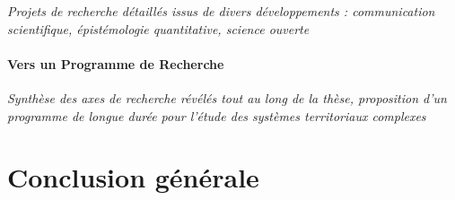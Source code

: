 
\textit{Projets de recherche détaillés issus de divers développements : communication scientifique, épistémologie quantitative, science ouverte}


\paragraph{Vers un Programme de Recherche}

\textit{Synthèse des axes de recherche révélés tout au long de la thèse, proposition d'un programme de longue durée pour l'étude des systèmes territoriaux complexes}



\section*{Conclusion générale}
















